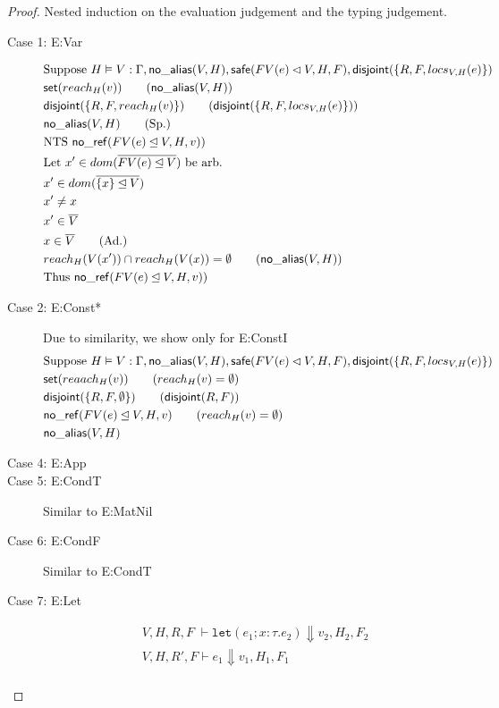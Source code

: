 \documentclass[11pt]{article}
\newcommand{\ms}[1]{\ensuremath{\mathsf{#1}}}
\newcommand{\irl}[1]{\mathtt{#1}}
\newcommand{\na}[1]{\mathsf{no\_alias}(#1)}
\newcommand{\nr}[1]{\mathsf{no\_ref}(#1)}
\newcommand{\safe}[1]{\mathsf{safe}(#1)}
\newcommand{\dist}[1]{\mathsf{disjoint}(#1)}
\begin{document}
\begin{proof}
Nested induction on the evaluation judgement and the typing judgement.\\
\begin{description}
  \item[Case 1: E:Var]
  \begin{align*}
  &\text{Suppose } H \vDash V : \Gamma, \na{V,H}, \safe{FV(e) \lhd V,H,F}, \dist{\{R,F,locs_{V,H}(e)\}}\\
  &\ms{set}(reach_{H}(v)) \tag{$\na{V,H}$}\\
  &\dist{\{R,F,reach_{H}(v)\}} \tag{$\dist{\{R,F,locs_{V,H}(e)\}}$}\\
  &\na{V,H} \tag{Sp.}\\
  &\text{NTS } \nr{FV(e) \unlhd V, H, v)}\\
  &\text{Let } x' \in dom(\overline{FV(e) \unlhd V}) \text{ be arb.}\\
  &x' \in dom(\overline{\{x\} \unlhd V})\\
  &x' \ne x\\
  &x' \in \overline V\\
  &x \in \overline V \tag{Ad.}\\
  &reach_H(V(x')) \cap reach_H(V(x)) = \emptyset \tag{$\na{V,H}$}\\
  &\text{Thus } \nr{FV(e) \unlhd V, H, v)}
  \end{align*}
  \item[Case 2: E:Const*]
  Due to similarity, we show only for E:ConstI
  \begin{align*}
  &\text{Suppose } H \vDash V : \Gamma, \na{V,H}, \safe{FV(e) \lhd V,H,F},\dist{\{R,F,locs_{V,H}(e)\}}\\
  &\ms{set}(reaach_{H}(v)) \tag{$reach_H(v) = \emptyset$}\\
  &\dist{\{R,F,\emptyset\}} \tag{$\dist{R,F}$}\\
  &\nr{FV(e) \unlhd V,H,v} \tag{$reach_H(v) = \emptyset$}\\
  &\na{V,H}
  \end{align*}
  \item[Case 4: E:App]
  \item[Case 5: E:CondT] Similar to E:MatNil
  \item[Case 6: E:CondF] Similar to E:CondT
  \item [Case 7: E:Let]
  \begin{align*}
  &V,H,R,F \; \vdash \irl{let}(e_1; x : \tau.e_2) \Downarrow v_2,H_2,F_2 \tag{case}\\
  &V,H,R',F \vdash e_1 \Downarrow v_1,H_1,F_1 \tag{ad.}\\

\end{align*}
\end{description}
\end{proof}
\end{document}
